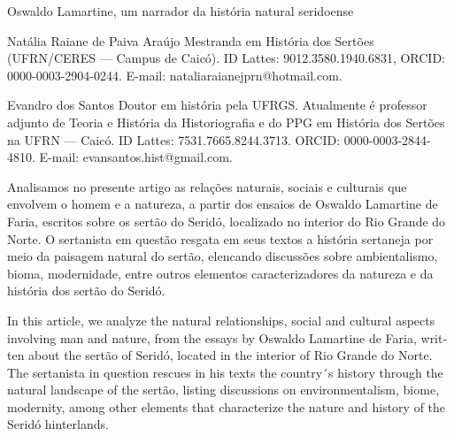 \begin{refsection}
    \renewcommand{\thefigure}{\arabic{figure}}
    \renewcommand{\thetable}{\arabic{table}}
    
    \chapterOneLine
    {Oswaldo Lamartine, um narrador da história natural seridoense}
    \label{chap:oswaldo-lamartine-na}

    \articleAuthor
    {Natália Raiane de Paiva Araújo}
    {Mestranda em História dos Sertões (UFRN/CERES --- Campus de Caicó). ID Lattes: 9012.3580.1940.6831, ORCID: 0000-0003-2904-0244. E-mail: natalia\textunderscore{}raianejprn@hotmail.com.}
    
    \articleAuthor
    {Evandro dos Santos}
    {Doutor em história pela UFRGS. Atualmente é professor adjunto de Teoria e História da Historiografia e do PPG em História dos Sertões na UFRN --- Caicó. ID Lattes: 7531.7665.8244.3713. ORCID: 0000-0003-2844-4810. E-mail: evansantos.hist@gmail.com.  }
    
    \begin{galoResumo}
        Analisamos no presente artigo as relações naturais, sociais e culturais que envolvem o homem e a natureza, a partir dos ensaios de Oswaldo Lamartine de Faria, escritos sobre os sertão do Seridó, localizado no interior do Rio Grande do Norte. O sertanista em questão resgata em seus textos a história sertaneja por meio da paisagem natural do sertão, elencando discussões sobre ambientalismo, bioma, modernidade, entre outros elementos caracterizadores da natureza e da história dos sertão do Seridó.
    \end{galoResumo}
    

    \begin{otherlanguage}{english}


        \begin{galoResumo}[Abstract]
            In this article, we analyze the natural relationships, social and cultural aspects involving man and nature, from the essays by Oswaldo Lamartine de Faria, written about the sertão of Seridó, located in the interior of Rio Grande do Norte. The sertanista in question rescues in his texts the country´s history through the natural landscape of the sertão, listing discussions on environmentalism, biome, modernity, among other elements that characterize the nature and history of the Seridó hinterlands. 
        \end{galoResumo}
        

\end{otherlanguage}
\end{refsection}
